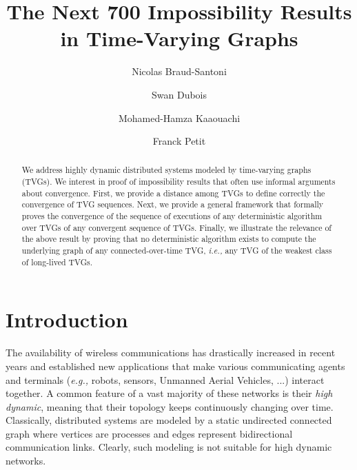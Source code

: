 \documentclass[11pt]{article}
\newcommand{\ie}{{\em i.e.,}\xspace}
\newcommand{\eg}{{\em e.g.,}\xspace}
\begin{document}
\title{The Next 700 Impossibility Results in Time-Varying Graphs}

\renewcommand*{\thefootnote}{\fnsymbol{footnote}}

\author{
Nicolas Braud-Santoni\footnotemark[1]
\and
Swan Dubois\footnotemark[2]
\and
Mohamed-Hamza Kaaouachi\footnotemark[2]
\and 
Franck Petit\footnotemark[2] \footnotemark[3]
}


\renewcommand*{\thefootnote}{\arabic{footnote}}
\setcounter{footnote}{0}

\date{}
\maketitle

\begin{abstract}
We address highly dynamic distributed systems modeled by time-varying graphs (TVGs). We interest in proof of impossibility results that often use informal arguments about convergence. First, we provide a distance among TVGs to define correctly the convergence of TVG sequences. Next, we provide a general framework that formally proves the convergence of the sequence of executions of any deterministic algorithm over TVGs of any convergent sequence of TVGs. Finally, we illustrate the relevance of the above result by proving that no deterministic algorithm exists to compute the underlying graph of any connected-over-time TVG, \ie any TVG of the weakest class of long-lived TVGs.
\end{abstract}

\section{Introduction}\label{sec:intro}

The availability of wireless communications has drastically increased in recent years and established new applications
that make various communicating agents and terminals (\eg robots, sensors, Unmanned Aerial Vehicles, ...) interact
together. A common feature of a vast majority of these networks is their {\em high
dynamic}, meaning that their topology keeps continuously changing over time.  
Classically, distributed systems are
modeled by a static undirected connected graph where vertices are processes and edges represent bidirectional
communication links.  Clearly, such modeling is not suitable for high dynamic networks.  
\end{document}

